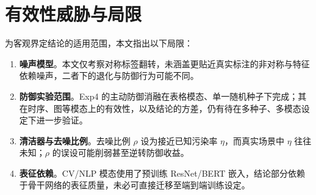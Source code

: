 \section{有效性威胁与局限}

为客观界定结论的适用范围，本文指出以下局限：
\begin{enumerate}
    \item \textbf{噪声模型}。本文仅考察对称标签翻转，未涵盖更贴近真实标注的非对称与特征依赖噪声，二者下的退化与防御行为可能不同。
    \item \textbf{防御实验范围}。Exp4 的主动防御消融在表格模态、单一随机种子下完成；其在时序、图等模态上的有效性，以及结论的方差，仍有待在多种子、多模态设定下进一步验证。
    \item \textbf{清洁器与去噪比例}。去噪比例 $\rho$ 设为接近已知污染率 $\eta$，而真实场景中 $\eta$ 往往未知；$\rho$ 的误设可能削弱甚至逆转防御收益。
    \item \textbf{表征依赖}。CV/NLP 模态使用了预训练 ResNet/BERT 嵌入，结论部分依赖于骨干网络的表征质量，未必可直接迁移至端到端训练设定。
\end{enumerate}
